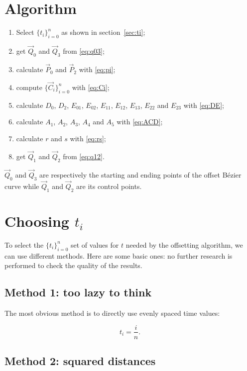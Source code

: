 \documentclass{scrartcl}
\newcommand\V[1]{\vec{#1}}
\begin{document}
\section{Algorithm}

\begin{enumerate}
    \item Select $\{t_i\}_{i=0}^n$ as shown in section~\ref{sec:ti};
    \item get $\V{Q}_0$ and $\V{Q}_3$ from \eqref{eq:q03};
    \item calculate $\V{P}_0$ and $\V{P}_2$ with \eqref{eq:pi};
    \item compute $\{\V{C}_i\}_{i=0}^n$ with \eqref{eq:Ci};
    \item calculate $D_0$, $D_2$, $E_{01}$, $E_{02}$, $E_{11}$,
	$E_{12}$, $E_{13}$, $E_{22}$ and $E_{23}$ with \eqref{eq:DE};
    \item calculate $A_1$, $A_2$, $A_3$, $A_4$ and $A_5$ with
	\eqref{eq:ACD};
    \item calculate $r$ and $s$ with \eqref{eq:rs};
    \item get $\V{Q}_1$ and $\V{Q}_2$ from \eqref{eq:q12}.
\end{enumerate}

$\V{Q}_0$ and $\V{Q}_3$ are respectively the starting and ending
points of the offset Bézier curve while $\V{Q}_1$ and $\V{Q}_2$ are
its control points.

\clearpage
\section{Choosing $t_i$\label{sec:ti}}

To select the $\{t_i\}_{i=0}^n$ set of values for $t$ needed by
the offsetting algorithm, we can use different methods. Here are some
basic ones: no further research is performed to check the quality of
the results.

\subsection{Method 1: too lazy to think}

The most obvious method is to directly use evenly spaced time values:

\begin{equation*}
    t_i = \frac{i}{n}.
\end{equation*}

\subsection{Method 2: squared distances}
\end{document}
